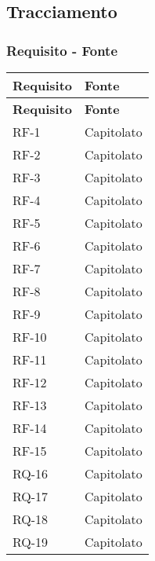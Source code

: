 \subsection{Tracciamento}
\subsubsection{Requisito - Fonte}
\begin{longtable}{|>{\centering\arraybackslash}m{}|>{\centering\arraybackslash}m{}|}
	\hline
	\textbf{Requisito} & \textbf{Fonte} \\\hline
	\endfirsthead
	\textbf{Requisito} & \textbf{Fonte} \\\hline
	\endhead
	RF-1               & Capitolato     \\\hline
	RF-2               & Capitolato     \\\hline
	RF-3               & Capitolato     \\\hline
	RF-4               & Capitolato     \\\hline
	RF-5               & Capitolato     \\\hline
	RF-6               & Capitolato     \\\hline
	RF-7               & Capitolato     \\\hline
	RF-8               & Capitolato     \\\hline
	RF-9               & Capitolato     \\\hline
	RF-10              & Capitolato     \\\hline
	RF-11              & Capitolato     \\\hline
	RF-12              & Capitolato     \\\hline
	RF-13              & Capitolato     \\\hline
	RF-14              & Capitolato     \\\hline
	RF-15              & Capitolato     \\\hline
	RQ-16              & Capitolato     \\\hline
	RQ-17              & Capitolato     \\\hline
	RQ-18              & Capitolato     \\\hline
	RQ-19              & Capitolato     \\\hline

\end{longtable}
